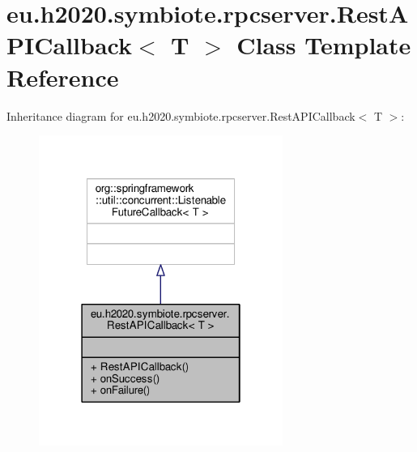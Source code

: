 \hypertarget{classeu_1_1h2020_1_1symbiote_1_1rpcserver_1_1RestAPICallback}{}\section{eu.\+h2020.\+symbiote.\+rpcserver.\+Rest\+A\+P\+I\+Callback$<$ T $>$ Class Template Reference}
\label{classeu_1_1h2020_1_1symbiote_1_1rpcserver_1_1RestAPICallback}


Inheritance diagram for eu.\+h2020.\+symbiote.\+rpcserver.\+Rest\+A\+P\+I\+Callback$<$ T $>$\+:\nopagebreak
\begin{figure}[H]
\begin{center}
\leavevmode
\includegraphics[width=226pt]{classeu_1_1h2020_1_1symbiote_1_1rpcserver_1_1RestAPICallback__inherit__graph}
\end{center}
\end{figure}


